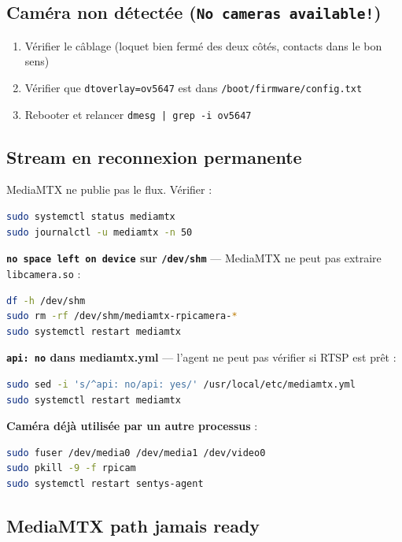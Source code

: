 \documentclass[12pt,a4paper]{article}
\begin{document}
\subsection{Caméra non détectée (\texttt{No cameras available!})}

\begin{enumerate}
  \item Vérifier le câblage (loquet bien fermé des deux côtés, contacts dans le bon sens)
  \item Vérifier que \texttt{dtoverlay=ov5647} est dans \texttt{/boot/firmware/config.txt}
  \item Rebooter et relancer \texttt{dmesg | grep -i ov5647}
\end{enumerate}

\subsection{Stream en reconnexion permanente}

MediaMTX ne publie pas le flux. Vérifier :
\begin{lstlisting}[language=bash]
sudo systemctl status mediamtx
sudo journalctl -u mediamtx -n 50
\end{lstlisting}

\textbf{\texttt{no space left on device} sur \texttt{/dev/shm}} — MediaMTX ne peut pas
extraire \texttt{libcamera.so} :
\begin{lstlisting}[language=bash]
df -h /dev/shm
sudo rm -rf /dev/shm/mediamtx-rpicamera-*
sudo systemctl restart mediamtx
\end{lstlisting}

\textbf{\texttt{api: no} dans mediamtx.yml} — l'agent ne peut pas vérifier si RTSP est prêt :
\begin{lstlisting}[language=bash]
sudo sed -i 's/^api: no/api: yes/' /usr/local/etc/mediamtx.yml
sudo systemctl restart mediamtx
\end{lstlisting}

\textbf{Caméra déjà utilisée par un autre processus} :
\begin{lstlisting}[language=bash]
sudo fuser /dev/media0 /dev/media1 /dev/video0
sudo pkill -9 -f rpicam
sudo systemctl restart sentys-agent
\end{lstlisting}

\subsection{MediaMTX path jamais ready}
\end{document}
